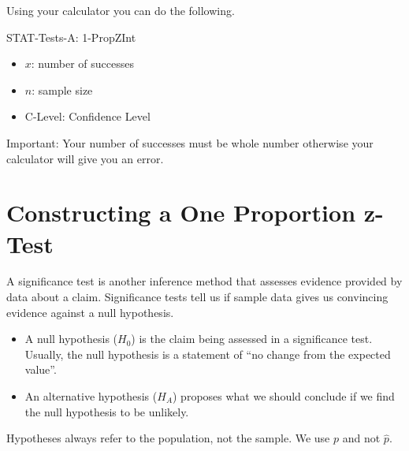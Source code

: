 \documentclass[../stats.tex]{subfiles}
\begin{document}
Using your calculator you can do the following.

STAT-Tests-A: 1-PropZInt
\begin{itemize}
    \item $x$: number of successes 
    \item $n$: sample size 
    \item C-Level: Confidence Level 
\end{itemize}

Important: Your number of successes must be whole number otherwise your calculator will give you an error.

\section{Constructing a One Proportion z-Test}
A significance test is another inference method that assesses evidence provided by data about a claim. Significance tests tell us if sample data gives us convincing evidence against a null hypothesis.
\begin{itemize}
    \item A null hypothesis ($H_0$) is the claim being assessed in a significance test. Usually, the null hypothesis is a statement of ``no change from the expected value''.
    \item An alternative hypothesis ($H_A$) proposes what we should conclude if we find the null hypothesis to be unlikely.
\end{itemize}

Hypotheses always refer to the population, not the sample. We use $p$ and not $\hat{p}$.
\end{document}
